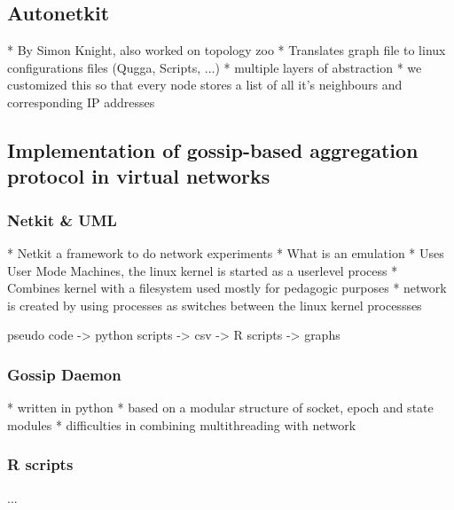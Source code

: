 \documentclass[11pt,a4paper]{article}
\begin{document}
\subsection{Autonetkit}
* By Simon Knight, also worked on topology zoo
* Translates graph file to linux configurations files (Qugga, Scripts, ...)
* multiple layers of abstraction
* we customized this so that every node stores a list of all it's neighbours and corresponding IP addresses

\subsection{Implementation of gossip-based aggregation protocol in virtual networks}
\subsubsection{Netkit \& UML}
* Netkit a framework to do network experiments
* What is an emulation
* Uses User Mode Machines, the linux kernel is started as a userlevel process
* Combines kernel with a filesystem used mostly for pedagogic purposes
* network is created by using processes as switches between the linux kernel processses

pseudo code -> python scripts -> csv -> R scripts -> graphs
\subsubsection{Gossip Daemon}
* written in python
* based on a modular structure of socket, epoch and state modules
* difficulties in combining multithreading with network

\subsubsection{R scripts}
...
\end{document}
